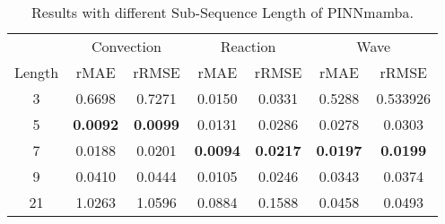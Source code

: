 \begin{table}[H]
\vspace{-3mm}
  \caption{Results with different Sub-Sequence Length of PINNmamba.}
  
  \centering
    \small
  \begin{tabular}{c|cc|cc|cc}

    \toprule 
      &\multicolumn{2}{c}{Convection }&\multicolumn{2}{c}{Reaction}&\multicolumn{2}{c}{Wave}\\
    \cmidrule(lr){2-3}\cmidrule(lr){4-5}\cmidrule(lr){6-7}
   Length & rMAE & rRMSE & rMAE & rRMSE & rMAE & rRMSE\\
   \midrule
   3 &0.6698 & 0.7271 &0.0150 & 0.0331&  0.5288 & 0.533926 \\
 5 &\textbf{0.0092} & \textbf{0.0099}&0.0131 & 0.0286 & 0.0278&  0.0303 \\
 7 &0.0188 & 0.0201 &\textbf{0.0094} &\textbf{0.0217} & \textbf{0.0197} &  \textbf{0.0199}\\
 9 &0.0410 &0.0444 &0.0105 & 0.0246 &0.0343 & 0.0374 \\
21 &1.0263 & 1.0596 &0.0884 & 0.1588 & 0.0458& 0.0493 \\
    

   

    \bottomrule
  \end{tabular}
  \normalsize
  \label{tab:length}

\end{table}
